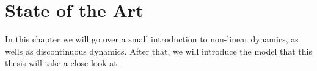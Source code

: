 \chapter{State of the Art}

In this chapter we will go over a small introduction to non-linear dynamics, as wells as discontinuous dynamics.
After that, we will introduce the model that this thesis will take a close look at.








